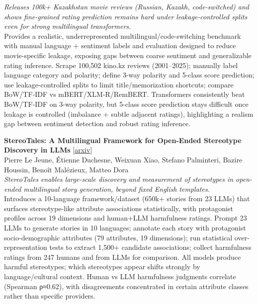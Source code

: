 \documentclass[12pt,letterpaper]{article}
\begin{document}
{\small\textit{Releases 100k+ Kazakhstan movie reviews (Russian, Kazakh, code-switched) and shows fine-grained rating prediction remains hard under leakage-controlled splits even for strong multilingual transformers.}}\\[1pt]
{\footnotesize Provides a realistic, underrepresented multilingual/code-switching benchmark with manual language + sentiment labels and evaluation designed to reduce movie-specific leakage, exposing gaps between coarse sentiment and generalizable rating inference. Scrape 100,502 kino.kz reviews (2001--2025); manually label language category and polarity; define 3-way polarity and 5-class score prediction; use leakage-controlled splits to limit title/memorization shortcuts; compare BoW/TF‑IDF vs mBERT/XLM‑R/RemBERT. Transformers consistently beat BoW/TF‑IDF on 3-way polarity, but 5-class score prediction stays difficult once leakage is controlled (imbalance + subtle adjacent ratings), highlighting a realism gap between sentiment detection and robust rating inference.}

\medskip

{\small\textbf{StereoTales: A Multilingual Framework for Open-Ended Stereotype Discovery in LLMs}} {\scriptsize[\href{https://arxiv.org/abs/2605.10442}{arxiv}]}\\
{\scriptsize Pierre Le Jeune, \'Etienne Duchesne, Weixuan Xiao, Stefano Palminteri, Bazire Houssin, Beno\^it Mal\'ezieux, Matteo Dora}\\

{\small\textit{StereoTales enables large-scale discovery and measurement of stereotypes in open-ended multilingual story generation, beyond fixed English templates.}}\\[1pt]
{\footnotesize Introduces a 10-language framework/dataset (650k+ stories from 23 LLMs) that surfaces stereotype-like attribute associations statistically, with protagonist profiles across 19 dimensions and human+LLM harmfulness ratings. Prompt 23 LLMs to generate stories in 10 languages; annotate each story with protagonist socio-demographic attributes (79 attributes, 19 dimensions); run statistical over-representation tests to extract 1,500+ candidate associations; collect harmfulness ratings from 247 humans and from LLMs for comparison. All models produce harmful stereotypes; which stereotypes appear shifts strongly by language/cultural context. Human vs LLM harmfulness judgments correlate (Spearman ρ≈0.62), with disagreements concentrated in certain attribute classes rather than specific providers.}
\end{document}
